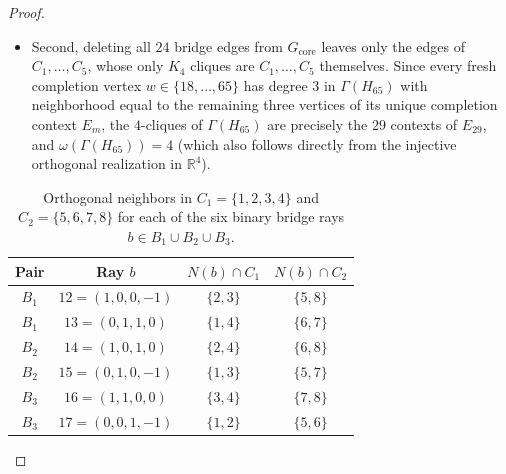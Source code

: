 \documentclass[
  aps,
  pra,
  reprint,
  superscriptaddress,
  amsmath,
  amssymb,
  nofootinbib,
  floatfix
]{revtex4-2}
\theoremstyle{definition}
\theoremstyle{remark}
\newcommand{\R}{\mathbb{R}}
\begin{document}
\begin{proof}
\begin{itemize}
To verify Eq.~\eqref{eq:span-condition}, consider $a v_{u_m}+b v_{v_m}$ with $ab\ne0$. If $u_m\in C_1$, its nonzero coordinate lies outside the two-coordinate support of $v_{v_m}$, so the combination has support size three; no core vector has that support size. If $u_m\in C_2$, write $v_{u_m}=h\in\{\pm1\}^4$. Orthogonality makes the two nonzero components of $v_{v_m}$ have opposite signs relative to those of $h$. After rescaling, the component magnitudes are those of
\begin{equation*}
(1+t,\,1-t,\,1,\,1),\qquad t\in\R\setminus\{0\},
\end{equation*}
up to permutation. For $t=\pm1$ the support size is three. Otherwise all four components are nonzero, so proportionality to a core vector would require $|1+t|=|1-t|=1$, which forces $t=0$. Both cases exclude any other core ray from $L_m$. The reproducible completion rule and exact integer verification in Appendix~\ref{app:verification} confirm that $v_i\cdot v_j=0$ holds exactly for the $5\times 6+24\times 6=174$ edges of $\Gamma(H_{65})$.
\item Second, deleting all $24$ bridge edges from $G_{\mathrm{core}}$ leaves only the edges of $C_1,\ldots,C_5$, whose only $K_4$ cliques are $C_1,\ldots,C_5$ themselves. Since every fresh completion vertex $w\in\{18,\ldots,65\}$ has degree $3$ in $\Gamma(H_{65})$ with neighborhood equal to the remaining three vertices of its unique completion context $E_m$, the $4$-cliques of $\Gamma(H_{65})$ are precisely the $29$ contexts of $E_{29}$, and $\omega(\Gamma(H_{65}))=4$ (which also follows directly from the injective orthogonal realization in $\R^4$).
\end{itemize}

\begin{table}[t]
\caption{Orthogonal neighbors in $C_1=\{1,2,3,4\}$ and $C_2=\{5,6,7,8\}$ for each of the six binary bridge rays $b\in B_1\cup B_2\cup B_3$.}\label{tab:bridge-neighbors}
\begin{ruledtabular}
\begin{tabular}{cccc}
Pair & Ray $b$ & $N(b)\cap C_1$ & $N(b)\cap C_2$ \\ \hline
$B_1$ & $12=(1,0,0,-1)$ & $\{2,3\}$ & $\{5,8\}$ \\
$B_1$ & $13=(0,1,1,0)$  & $\{1,4\}$ & $\{6,7\}$ \\ \hline
$B_2$ & $14=(1,0,1,0)$  & $\{2,4\}$ & $\{6,8\}$ \\
$B_2$ & $15=(0,1,0,-1)$ & $\{1,3\}$ & $\{5,7\}$ \\ \hline
$B_3$ & $16=(1,1,0,0)$  & $\{3,4\}$ & $\{7,8\}$ \\
$B_3$ & $17=(0,0,1,-1)$ & $\{1,2\}$ & $\{5,6\}$
\end{tabular}
\end{ruledtabular}
\end{table}


\end{proof}
\end{document}
